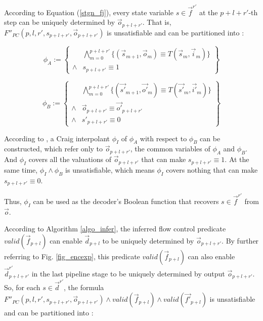 \documentclass[conference]{IEEEtran}
\begin{document}
According to Equation (\ref{stgn_fj}),
every state variable $s\in \vec{f}^{r'}$ at the $p+l+r'$-th step can be uniquely determined by $\vec{o}_{p+l+r'}$.
That is,
$F''_{PC}(p,l,r',s_{p+l+r'},\vec{o}_{p+l+r'})$ is unsatisfiable and can be partitioned into :

\begin{equation}
 \phi_A := 
 \left\{
\begin{array}{cc}
&\bigwedge_{m=0}^{p+l+r'}
\{
(\vec{s}_{m+1},\vec{o}_m)\equiv T(\vec{s}_m,\vec{i}_m)
\}
\\
\wedge& s_{p+l+r'}\equiv 1 
\end{array}
\right\}
\end{equation}

\begin{equation}
\phi_B := 
\left\{
\begin{array}{cc}
&\bigwedge_{m=0}^{p+l+r'}
\{
(\vec{s'}_{m+1},\vec{o'}_m)\equiv T(\vec{s'}_m,\vec{i'}_m)
\}
\\
\wedge&\vec{o}_{p+l+r'}\equiv \vec{o'}_{p+l+r'} \\
\wedge& s'_{p+l+r'}\equiv 0 
\end{array}
\right\}
\end{equation}


According to \cite{InterpBoolFunction},
a Craig interpolant $\phi_I$ of $\phi_A$ with respect to $\phi_B$ can be constructed,
which refer only to $\vec{o}_{p+l+r'}$,
the common variables of $\phi_A$ and $\phi_B$.
And $\phi_I$ covers all the valuations of $\vec{o}_{p+l+r'}$ that can make $s_{p+l+r'}\equiv 1$.
At the same time,
$\phi_I\wedge \phi_B$ is unsatisfiable,
which means $\phi_I$ covers nothing that can make $s_{p+l+r'}\equiv 0$.

Thus,
$\phi_I$ can be used as the decoder's Boolean function 
that recovers $s\in \vec{f}^{r'}$ from $\vec{o}$.

According to Algorithm \ref{algo_infer},
the inferred flow control predicate $valid(\vec{f}_{p+l})$ can
enable $\vec{d}_{p+l}$ to be uniquely determined by $\vec{o}_{p+l+r'}$.
By further referring to Fig. \ref{fig_encexp},
this predicate $valid(\vec{f}_{p+l})$ can also enable $\vec{d}^{r'}_{p+l+r'}$ 
in the last pipeline stage to be uniquely determined by output $\vec{o}_{p+l+r'}$.
So,
for each $s\in \vec{d}^{r'}$,
the formula $F''_{PC}(p,l,r',s_{p+l+r'},\vec{o}_{p+l+r'})\wedge valid(\vec{f}_{p+l})\wedge valid(\vec{f'}_{p+l})$ is unsatisfiable 
and can be partitioned into :
\end{document}
